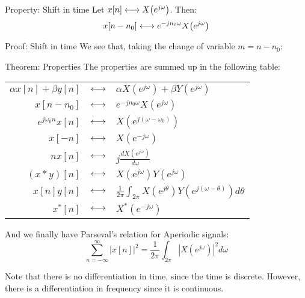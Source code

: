 \documentclass[a4paper]{article}
\begin{document}
\begin{parag}{Property: Shift in time}
    Let $x\left[n\right] \dtfourierpair X\left(e^{j\omega}\right)$. Then:
    \[x\left[n - n_0\right] \dtfourierpair e^{-j n_0 \omega} X\left(e^{j \omega}\right)\]

    \begin{subparag}{Proof: Shift in time}
        We see that, taking the change of variable $m = n - n_0$:
    \end{subparag}
\end{parag}

\begin{parag}{Theorem: Properties}
     The properties are summed up in the following table:
    \begin{center}
    \begin{tabular}{|rcl|}
        \hline
        $\displaystyle \alpha x\left[n\right] + \beta y\left[n\right]$ & $\longleftrightarrow$ & $\displaystyle \alpha X\left(e^{j \omega}\right) +  \beta Y\left(e^{j \omega}\right)$  \\
        $\displaystyle x\left[n - n_0\right]$ & $\longleftrightarrow$ & $\displaystyle e^{-j n_0 \omega} X\left(e^{j \omega}\right)$  \\
        $\displaystyle e^{j \omega_0 n} x\left[n\right]$ & $\longleftrightarrow$ & $\displaystyle X\left(e^{j\left(\omega - \omega_0\right)}\right)$   \\
        $\displaystyle x\left[-n\right]$ & $\longleftrightarrow$ & $\displaystyle X\left(e^{-j \omega}\right)$  \\
        \hline
        $\displaystyle n x\left[n\right]$ & $\longleftrightarrow$ & $\displaystyle j \frac{dX\left(e^{j \omega}\right)}{d \omega}$  \\
        \hline
        $\displaystyle \left(x*y\right)\left[n\right]$ & $\longleftrightarrow$ & $\displaystyle X\left(e^{j\omega}\right)Y\left(e^{j\omega}\right)$  \\
        $\displaystyle x\left[n\right]y\left[n\right]$ & $\longleftrightarrow$ & $\displaystyle \frac{1}{2\pi} \int_{2\pi} X\left(e^{j \theta}\right) Y\left(e^{j \left(\omega - \theta\right)}\right) d\theta$  \\
        \hline
        $\displaystyle x^*\left[n\right]$ & $\longleftrightarrow$ & $\displaystyle X^*\left(e^{-j \omega}\right)$  \\
        \hline
    \end{tabular}
    \end{center}

    And we finally have Parseval's relation for Aperiodic signals:
    \[\sum_{n=-\infty}^{\infty} \left|x\left[n\right]\right|^2 = \frac{1}{2\pi} \int_{2\pi} \left|X\left(e^{j\omega}\right)\right|^2 d\omega\]

     Note that there is no differentiation in time, since the time is discrete. However, there is a differentiation in frequency since it is continuous.

\end{parag}
\end{document}
